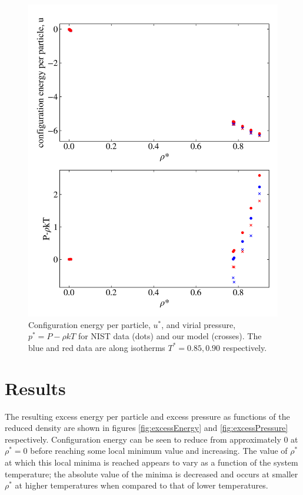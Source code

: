 \documentclass[10pt, twocolumn]{revtex4}    %
\begin{document}
\begin{figure}
	\includegraphics[width=\linewidth]{figures/NISTcomparison.png}
	\caption{Configuration energy per particle, $u^*$, and virial pressure, $p^{*} = P - \rho{}kT$ for NIST data (dots) and our model (crosses). The blue and red data are along isotherms $T^{*} = 0.85, 0.90$ respectively.}
	\label{fig:NIST_comparison}
\end{figure}



\section{Results} \label{s:results}

The resulting excess energy per particle and excess pressure as functions of the reduced density are shown in figures \ref{fig:excessEnergy} and \ref{fig:excessPressure} respectively. Configuration energy can be seen to reduce from approximately $0$ at $\rho{}^*=0$ before reaching some local minimum value and increasing. The value of $\rho{}^*$ at which this local minima is reached appears to vary as a function of the system temperature; the absolute value of the minima is decreased and occurs at smaller $\rho{}^*$ at higher temperatures when compared to that of lower temperatures.
\end{document}
